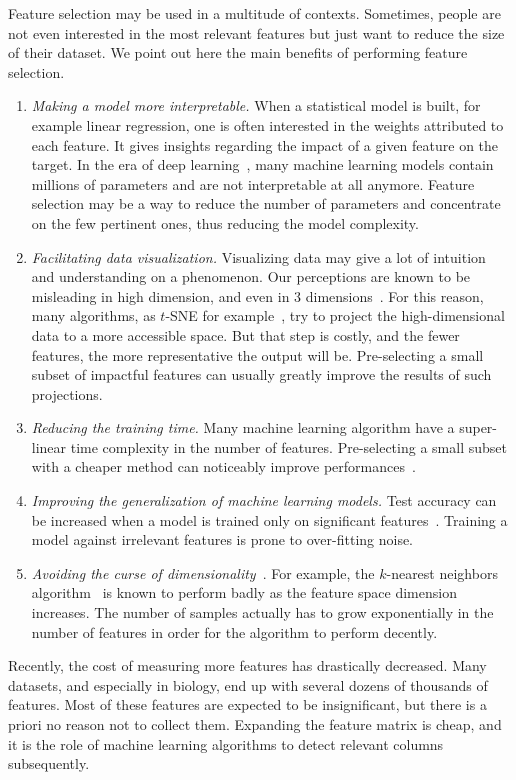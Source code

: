 Feature selection may be used in a multitude of contexts.
Sometimes, people are not even interested in the most relevant features
but just want to reduce the size of their dataset.
We point out here the main benefits of performing feature selection.
\begin{enumerate}
    \item \textit{Making a model more interpretable.}
    When a statistical model is built, for example linear regression,
    one is often interested in the weights attributed to each feature.
    It gives insights regarding the impact of a given feature on the target.
    In the era of deep learning~\citep{deep_learning},
    many machine learning models contain millions of parameters and are not interpretable at all anymore.
    Feature selection may be a way to reduce the number of parameters and concentrate on the few pertinent ones,
    thus reducing the model complexity.
    \item \textit{Facilitating data visualization.}
    Visualizing data may give a lot of intuition and understanding on a phenomenon.
    Our perceptions are known to be misleading in high dimension,
    and even in 3 dimensions~\citep{graphical_perception}.
    For this reason, many algorithms, as $t$-SNE for example~\citep{t_sne},
    try to project the high-dimensional data to a more accessible space.
    But that step is costly, and the fewer features, the more representative the output will be.
    Pre-selecting a small subset of impactful features can usually greatly improve the results of such projections.
    \item \textit{Reducing the training time.}
    Many machine learning algorithm have a super-linear time complexity in the number of features.
    Pre-selecting a small subset with a cheaper method
    can noticeably improve performances~\citep{high_dimensional_fs}.
    \item \textit{Improving the generalization of machine learning models.}
    Test accuracy can be increased when a model is trained only on significant features~\citep{fs_overfit}.
    Training a model against irrelevant features is prone to over-fitting noise.
    \item \textit{Avoiding the curse of dimensionality}~\citep{curse_dimensionality}.
    For example, the $k$-nearest neighbors algorithm~\citep{knn} is known to perform badly as the feature space
    dimension increases.
    The number of samples actually has to grow exponentially in the number of features in order for the algorithm
    to perform decently.
\end{enumerate}
Recently, the cost of measuring more features has drastically decreased.
Many datasets, and especially in biology, end up with several dozens of thousands of features.
Most of these features are expected to be insignificant, but there is a priori no reason not to collect them.
Expanding the feature matrix is cheap, and it is the role of machine learning algorithms
to detect relevant columns subsequently.

